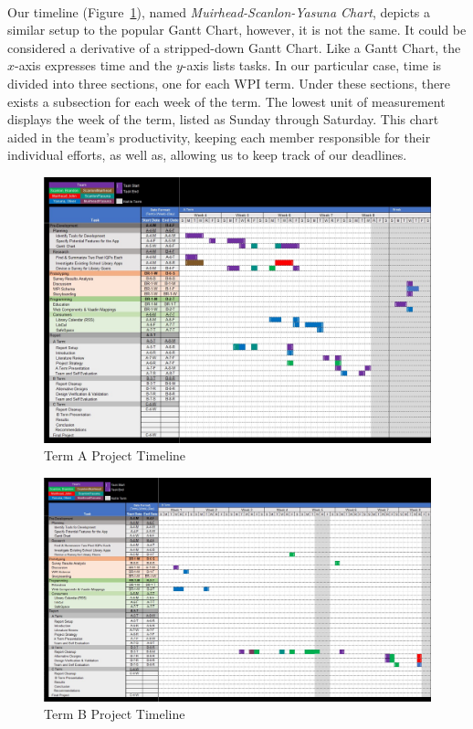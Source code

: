 \paragraph{}
Our timeline (Figure~\ref{fig:project_timeline}), named \textit{Muirhead-Scanlon-Yasuna Chart}, depicts a similar setup to the popular Gantt Chart, however, it is not the same. It could be considered a derivative of a stripped-down Gantt Chart. Like a Gantt Chart, the $x$-axis expresses time and the $y$-axis lists tasks. In our particular case, time is divided into three sections, one for each WPI term. Under these sections, there exists a subsection for each week of the term. The lowest unit of measurement displays the week of the term, listed as Sunday through Saturday. This chart aided in the team's productivity, keeping each member responsible for their individual efforts, as well as, allowing us to keep track of our deadlines.


\begin{figure}[H]
    \hspace*{-2.25cm}
    \includegraphics[scale=.58]{assets/img/Term A Timeline.jpg}
    \caption{Term A Project Timeline}
    \label{fig:project_timeline}
\end{figure}

\begin{figure}[H]
 \hspace*{-2.25cm}
    \includegraphics[scale=.49]{assets/img/Term B Timeline.jpg}
    \caption{Term B Project Timeline}
    \label{project_timeline}
\end{figure}
